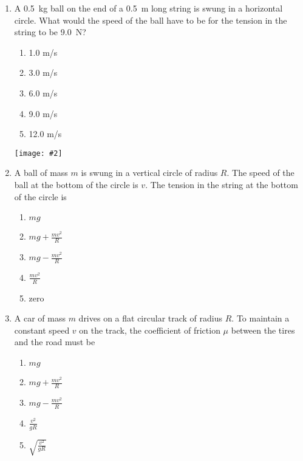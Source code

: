 \documentclass[12pt]{article}
\newcommand{\pic}[2]{\texttt{[image: \#2]}}
\begin{document}
\begin{enumerate}[leftmargin=50pt,label=\underline{\hspace{0.4in}} \arabic*]
\item A \SI{0.5}{\kg} ball on the end of a \SI{0.5}{m} long string is swung in a
  horizontal circle. What would the speed of the ball have to be for the
  tension in the string to be \SI{9.0}{\newton}?\\
  \begin{minipage}{0.35\textwidth}
    \begin{enumerate}[noitemsep,topsep=0pt]
    \item 1.0 m/s
    \item 3.0 m/s
    \item 6.0 m/s
    \item 9.0 m/s
    \item 12.0 m/s
    \end{enumerate}
  \end{minipage}
  \begin{minipage}{0.55\textwidth}
    \pic{.75}{ball-horizontal1.png}
  \end{minipage}

\item A ball of mass $m$ is swung in a vertical circle of radius $R$. The speed
  of the ball at the bottom of the circle is $v$. The tension in the string at
  the bottom of the circle is
  \begin{enumerate}[noitemsep,topsep=0pt]
  \item $\displaystyle mg$
  \item $\displaystyle mg+\frac{mv^2}{R}$
  \item $\displaystyle mg-\frac{mv^2}{R}$
  \item $\displaystyle \frac{mv^2}{R}$
  \item zero
  \end{enumerate}
  \newpage
\item A car of mass $m$ drives on a flat circular track of radius $R$. To
  maintain a constant speed $v$ on the track, the coefficient of friction $\mu$
  between the tires and the road must be
  \begin{enumerate}[noitemsep,topsep=0pt]
  \item $\displaystyle mg$
  \item $\displaystyle mg+\frac{mv^2}{R}$
  \item $\displaystyle mg-\frac{mv^2}{R}$
  \item $\displaystyle \frac{v^2}{gR}$
  \item $\displaystyle \sqrt{\frac{v^2}{gR}}$
  \end{enumerate}


\end{enumerate}
\end{document}
